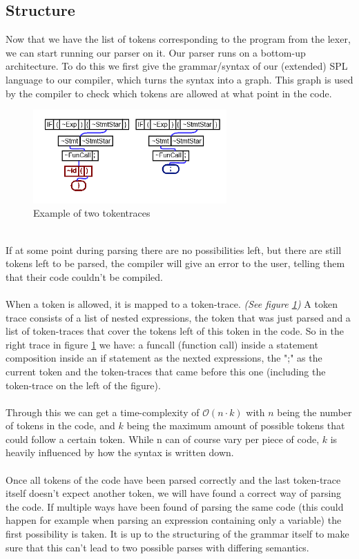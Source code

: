 \documentclass[10pt,a4paper]{article}
\begin{document}
\subsection{Structure}
Now that we have the list of tokens corresponding to the program from the lexer, we can start running our parser on it. Our parser runs on a bottom-up architecture. To do this we first give the grammar/syntax of our (extended) SPL language to our compiler, which turns the syntax into a graph. This graph is used by the compiler to check which tokens are allowed at what point in the code.
\begin{figure}[h]
\centering
\includegraphics[width=280px]{TokenTraces.png}
\caption{Example of two tokentraces}
\label{fig:traces}
\end{figure}\\
If at some point during parsing there are no possibilities left, but there are still tokens left to be parsed, the compiler will give an error to the user, telling them that their code couldn't be compiled.\\
\\
When a token is allowed, it is mapped to a token-trace. \textit{(See figure \ref{fig:traces})} A token trace consists of a list of nested expressions, the token that was just parsed and a list of token-traces that cover the tokens left of this token in the code. So in the right trace in figure \ref{fig:traces} we have: a funcall (function call) inside a statement composition inside an if statement as the nexted expressions, the ";" as the current token and the token-traces that came before this one (including the token-trace on the left of the figure). \\
\\
Through this we can get a time-complexity of $\mathcal{O}(n \cdot k) $ with $n$ being the number of tokens in the code, and $k$ being the maximum amount of possible tokens that could follow a certain token. While n can of course vary per piece of code, $k$ is heavily influenced by how the syntax is written down.\\
\\
Once all tokens of the code have been parsed correctly and the last token-trace itself doesn't expect another token, we will have found a correct way of parsing the code. If multiple ways have been found of parsing the same code (this could happen for example when parsing an expression containing only a variable) the first possibility is taken. It is up to the structuring of the grammar itself to make sure that this can't lead to two possible parses with differing semantics.
\end{document}
